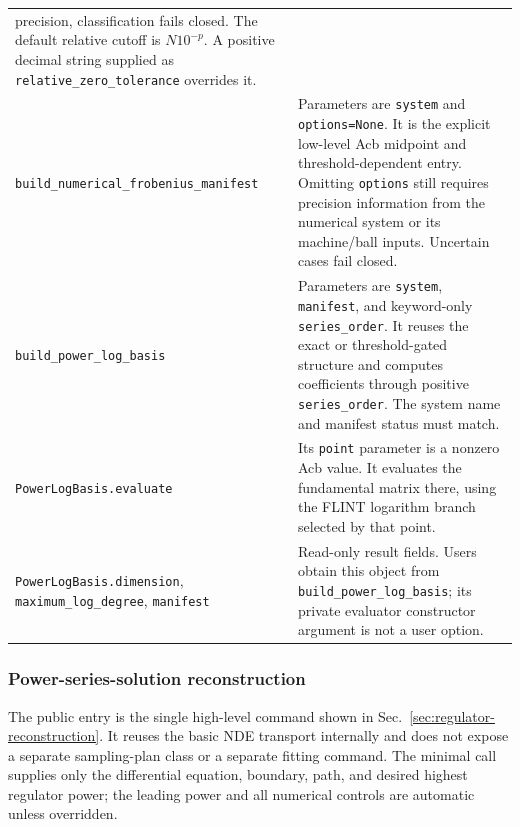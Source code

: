\documentclass[11pt]{article}
\begin{document}
\begin{longtable}{L{0.36\textwidth}L{0.58\textwidth}}
precision, classification fails closed.  The default relative cutoff is
$N10^{-p}$.  A positive decimal string supplied as \texttt{relative\_zero\_tolerance}
overrides it. \\
\texttt{build\_numerical\_}\newline\texttt{frobenius\_manifest} & Parameters are
\texttt{system} and
\texttt{options=None}.  It is the explicit low-level Acb midpoint and threshold-dependent
entry.  Omitting \texttt{options} still requires precision information from the numerical
system or its machine/ball inputs.  Uncertain cases fail closed. \\
\texttt{build\_power\_log\_basis} & Parameters are \texttt{system}, \texttt{manifest}, and
keyword-only \texttt{series\_order}.  It reuses the exact or
threshold-gated structure and computes coefficients through positive
\texttt{series\_order}.  The system name and manifest status must match. \\
\texttt{PowerLogBasis.evaluate} & Its \texttt{point} parameter is a nonzero Acb value.  It
evaluates the fundamental matrix there, using the FLINT logarithm branch selected by that
point. \\
\texttt{PowerLogBasis.dimension}, \texttt{maximum\_log\_degree}, \texttt{manifest} &
Read-only result fields.  Users obtain this object from \texttt{build\_power\_log\_basis};
its private evaluator constructor argument is not a user option. \\
\bottomrule
\end{longtable}
\normalsize

\subsubsection{Power-series-solution reconstruction}

The public entry is the single high-level command shown in
Sec.~\ref{sec:regulator-reconstruction}.  It reuses the basic NDE transport internally and
does not expose a separate sampling-plan class or a separate fitting command.
The minimal call supplies only the differential equation, boundary, path, and desired highest
regulator power; the leading power and all numerical controls are automatic unless overridden.
\end{document}
